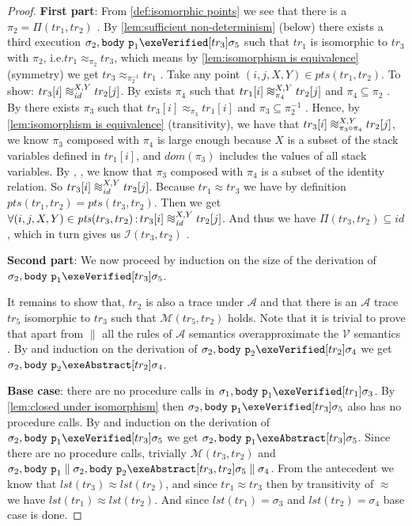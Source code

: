\documentclass[runningheads,a4paper]{llncs}
\makeatletter
\newcommand*{\ie}{i.e.\@\xspace}
\DeclareMathOperator{\suchthat}{:}
\newcommand*{\domain}[1]{\mathit{dom}(#1)}
\newcommand*{\identity}[0]{\mathit{id}}
\newcommand*{\last}[1]{\mathit{lst}(#1)}
\newcommand{\tr}{tr}
\newcommand*\iso{\approx}
\newcommand*{\parcomp}{\parallel}
\newcommand*\Asemantics{\mathcal{A}}
\newcommand*\asemantics{$\Asemantics$ semantics}
\newcommand*\Vsemantics{\mathcal{V}}
\newcommand*\vsemantics{$\Vsemantics$ semantics}
\newcommand*{\body}{\mathtt{body}}
\newcommand*{\fun}{\texttt{p}}
\newcommand*{\wiso}{%
  \mathrel{\vcenter{\offinterlineskip
  \hbox{$\sim$}\vskip-.35ex\hbox{$\sim$}\vskip-.35ex\hbox{$\sim$}}}}
\newcommand*{\myIsoCompatibleStates}{\mathit{pts}}
\newcommand*{\isoR}{\mathcal{I}}
\newcommand*{\mutR}{\mathcal{M}}
\newcommand*{\store}{\sigma}
\makeatother
\begin{document}
\begin{proof}
\textbf{First part}: From \cref{def:isomorphic points} we see that there is a $\pi_2=\Pi(\tr_1,\tr_2)$ \tagone{}. 
%
By \cref{lem:sufficient non-determinism} (below) there exists a third execution $\store_2,\body~\fun_1\exeVerified[\tr_3]\store_5$ such that $\tr_1$ is isomorphic to $\tr_3$ with $\pi_2$, \ie $\tr_1\iso_{\pi_2}\tr_3$, which means by \cref{lem:isomorphism is equivalence} (symmetry) we get $\tr_3\iso_{\pi^{-1}_2}\tr_1$ \tagtwo{}. 
%
Take any point $(i,j,X,Y) \in \myIsoCompatibleStates(tr_1, tr_2)$. To show: $\tr_3[i] \wiso_{\identity}^{X,Y} \tr_2[j]$.
%
By \tagone{} exists $\pi_4$ such that $\tr_1[i] \wiso_{\pi_4}^{X,Y} \tr_2[j]$ and $\pi_4 \subseteq \pi_2$ \tagfour{}. 
%
By \tagtwo{} there exists $\pi_3$ such that $\tr_3[i] \iso_{\pi_3} \tr_1[i]$ and $\pi_3 \subseteq \pi_2^{-1}$ \tagthree{}.
%
Hence, by \cref{lem:isomorphism is equivalence} (transitivity), we have that $\tr_3[i] \wiso_{\pi_3 \circ \pi_4}^{X,Y} \tr_2[j]$, we know $\pi_3$ composed with $\pi_4$ is large enough because $X$ is a subset of the stack variables defined in $\tr_1[i]$, and $\domain{\pi_3}$ includes the values of all stack variables.
%
By \tagthree{}, \tagfour{}, we know that $\pi_3$ composed with $\pi_4$ is a subset of the identity relation. So $\tr_3[i] \wiso_{\identity}^{X,Y} \tr_2[j]$. 
%
Because $\tr_1\iso\tr_3$ we have by definition $\myIsoCompatibleStates(tr_1, tr_2)=\myIsoCompatibleStates(tr_3, tr_2)$. Then we get $\forall (i,j,X,Y) \in \myIsoCompatibleStates(tr_3, tr_2) \suchthat \tr_3[i] \wiso_{\identity}^{X,Y} \tr_2[j]$. And thus we have $\Pi(\tr_3,\tr_2) \subseteq \identity$, which in turn gives us $\isoR(\tr_3,\tr_2)$ \tagfive{}.

\noindent\textbf{Second part}: We now proceed by induction on the size of the derivation of $\store_2,\body~\fun_1 \exeVerified[\tr_3] \store_5$.

It remains to show that, $\tr_2$ is also a trace under $\Asemantics$ and that there is an $\Asemantics$ trace $\tr_5$ isomorphic to $\tr_3$ such that $\mutR(\tr_5,\tr_2)$ holds. 
%
Note that it is trivial to prove that apart from $\parcomp$ all the rules of \asemantics{} overapproximate the \vsemantics{} \sublemmaone{}. 
%
By \sublemmaone{} and induction on the derivation of $\store_2,\body~\fun_2\exeVerified[\tr_2]\store_4$ we get $\store_2,\body~\fun_2\exeAbstract[\tr_2]\store_4$.
        
\noindent\textbf{Base case}: there are no procedure calls in $\store_1,\body~\fun_1\exeVerified[\tr_1]\store_3$. 
%
By \cref{lem:closed under isomorphism} then $\store_2,\body~\fun_1\exeVerified[\tr_3]\store_5$ also has no procedure calls. 
%
By \sublemmaone{} and induction on the derivation of $\store_2,\body~\fun_1\exeVerified[\tr_3]\store_5$ we get $\store_2,\body~\fun_1\exeAbstract[\tr_3]\store_5$. 
%
Since there are no procedure calls, trivially $\mutR(\tr_3,\tr_2)$  and $\store_2,\body~\fun_1 \parcomp \store_2,\body~\fun_2 \exeAbstract[\tr_3,\tr_2] \store_5 \parcomp \store_4$. 
%
From the antecedent we know that $\last{\tr_3}\iso\last{\tr_2}$, and since $\tr_1\iso\tr_3$ then by transitivity of $\iso$ we have $\last{\tr_1}\iso\last{\tr_2}$. And since $\last{\tr_1}=\store_3$ and $\last{\tr_2}=\store_4$ base case is done.


\end{proof}
\end{document}
